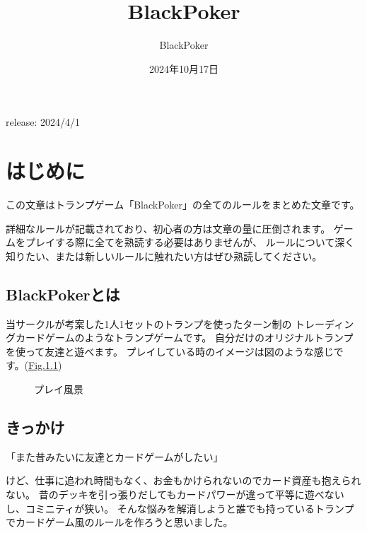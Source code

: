 \documentclass[letterpaper,10pt,dvipdfmx]{sphinxmanual}
\title{BlackPoker}
\date{2024年10月17日}
\author{BlackPoker}
\begin{document}
\pagestyle{empty}
\sphinxmaketitle
\pagestyle{plain}
\sphinxtableofcontents
\pagestyle{normal}
\label{\detokenize{index::doc}}


\sphinxAtStartPar
release: 2024/4/1

\sphinxstepscope


\chapter{はじめに}
\label{\detokenize{init/init:init-rst}}\label{\detokenize{init/init:id1}}\label{\detokenize{init/init::doc}}
\sphinxAtStartPar
この文章はトランプゲーム「BlackPoker」の全てのルールをまとめた文章です。

\sphinxAtStartPar
詳細なルールが記載されており、初心者の方は文章の量に圧倒されます。
ゲームをプレイする際に全てを熟読する必要はありませんが、
ルールについて深く知りたい、または新しいルールに触れたい方はぜひ熟読してください。


\section{BlackPokerとは}
\label{\detokenize{init/init:blackpoker}}
\sphinxAtStartPar
当サークルが考案した1人1セットのトランプを使ったターン制の
トレーディングカードゲームのようなトランプゲームです。
自分だけのオリジナルトランプを使って友達と遊べます。
プレイしている時のイメージは図のような感じです。(\hyperref[\detokenize{init/init:play-image}]{Fig.\@ \ref{\detokenize{init/init:play-image}}})

\begin{figure}[htbp]
\centering
\capstart

\noindent{}
\caption{プレイ風景}\label{\detokenize{init/init:id8}}\label{\detokenize{init/init:play-image}}\end{figure}


\section{きっかけ}
\label{\detokenize{init/init:id2}}
\begin{sphinxVerbatim}[commandchars=\\\{\}]
「また昔みたいに友達とカードゲームがしたい」
\end{sphinxVerbatim}

\sphinxAtStartPar
けど、仕事に追われ時間もなく、お金もかけられないのでカード資産も抱えられない。
昔のデッキを引っ張りだしてもカードパワーが違って平等に遊べないし、コミニティが狭い。
そんな悩みを解消しようと誰でも持っているトランプでカードゲーム風のルールを作ろうと思いました。
\end{document}
